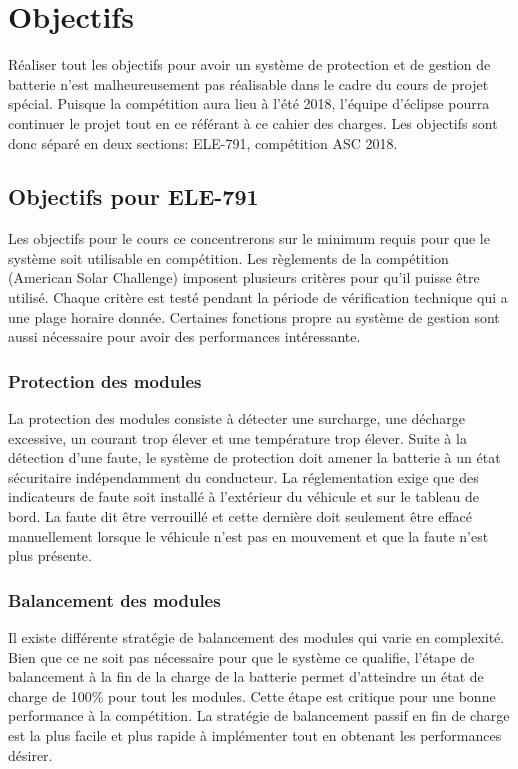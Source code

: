 
\section{Objectifs}
Réaliser tout les objectifs pour avoir un système de protection et de gestion de batterie  n'est malheureusement pas réalisable dans le cadre du cours de projet spécial. Puisque la compétition aura lieu à l'été 2018, l'équipe d'éclipse pourra continuer le projet tout en ce référant à ce cahier des charges. Les objectifs sont donc séparé en deux sections: ELE-791, compétition ASC 2018.  

	\subsection{Objectifs pour ELE-791}	
	Les objectifs pour le cours ce concentrerons sur le minimum requis pour que le système soit utilisable en compétition. Les règlements de la compétition (American Solar Challenge) imposent plusieurs critères pour qu'il puisse être utilisé. Chaque critère est testé pendant la période de vérification technique qui a une plage horaire donnée. Certaines fonctions propre au système de gestion sont aussi nécessaire pour avoir des performances intéressante.
	
		\subsubsection{Protection des modules} \label{protection_module}
		La protection des modules consiste à détecter une surcharge, une décharge excessive, un courant trop élever et une température trop élever. Suite à la détection d'une faute, le système de protection doit amener la batterie à un état sécuritaire indépendamment du conducteur. La réglementation exige que des indicateurs de faute soit installé à l'extérieur du véhicule et sur le tableau de bord. La faute dit être verrouillé et cette dernière doit seulement être effacé manuellement lorsque le véhicule n'est pas en mouvement et que la faute n'est plus présente.
	
		\subsubsection{Balancement des modules}
		Il existe différente stratégie de balancement des modules qui varie en complexité. Bien que ce ne soit pas nécessaire pour que le système ce qualifie, l'étape de balancement à la fin de la charge de la batterie permet d'atteindre un état de charge de 100\% pour tout les modules. Cette étape est critique pour une bonne performance à la compétition. La stratégie de balancement passif en fin de charge est la plus facile et plus rapide à implémenter tout en obtenant les performances désirer. 
				
